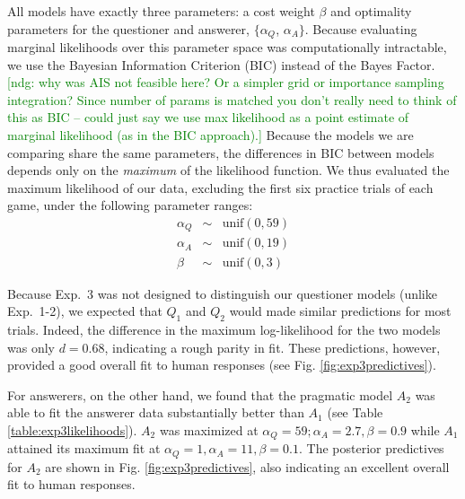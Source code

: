 \documentclass[11pt, floatsintext]{apa6}
\newcommand{\ndg}[1]{\textcolor{Green}{[ndg: #1]}}
\begin{document}
All models have exactly three parameters: a cost weight $\beta$ and optimality parameters for the questioner and answerer, $\{\alpha_Q$, $\alpha_A\}$.
Because evaluating marginal likelihoods over this parameter space was computationally intractable, we use the Bayesian Information Criterion (BIC) instead of the Bayes Factor. 
\ndg{why was AIS not feasible here? Or a simpler grid or importance sampling integration? Since number of params is matched you don't really need to think of this as BIC -- could just say we use max likelihood as a point estimate of marginal likelihood (as in the BIC approach).}
Because the models we are comparing share the same parameters, the differences in BIC between models depends only on the \emph{maximum} of the likelihood function.
We thus evaluated the maximum likelihood of our data, excluding the first six practice trials of each game, under the following parameter ranges:
$$
\begin{array}{rcl}
\alpha_Q & \sim & \textrm{unif}(0, 59) \\
\alpha_A & \sim & \textrm{unif}(0, 19) \\
\beta & \sim & \textrm{unif}(0, 3)
\end{array}
$$

Because Exp.~3 was not designed to distinguish our questioner models (unlike Exp.~1-2), we expected that $Q_1$ and $Q_2$ would made similar predictions for most trials. 
Indeed, the difference in the maximum log-likelihood for the two models was only $d=0.68$, indicating a rough parity in fit.
These predictions, however, provided a good overall fit to human responses (see Fig. \ref{fig:exp3predictives}).

For answerers, on the other hand, we found that the pragmatic model $A_2$ was able to fit the answerer data substantially better than $A_1$ (see Table \ref{table:exp3likelihoods}).
$A_2$ was maximized at $\alpha_Q = 59; \alpha_A = 2.7, \beta = 0.9$ while $A_1$ attained its maximum fit at $\alpha_Q = 1, \alpha_A = 11, \beta = 0.1$. 
The posterior predictives for $A_2$ are shown in  Fig. \ref{fig:exp3predictives}, also indicating an excellent overall fit to human responses.
\end{document}
